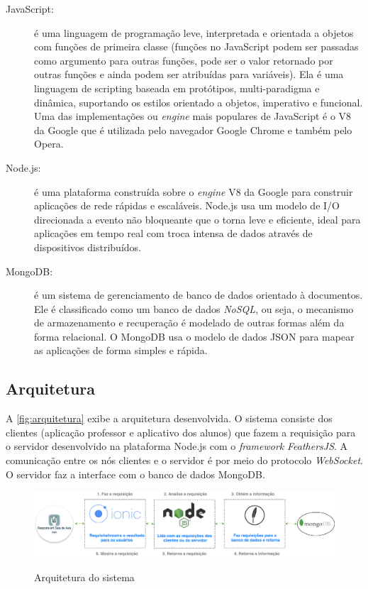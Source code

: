 \begin{description}
  \item[JavaScript:] é uma linguagem de programação leve, interpretada e orientada a objetos com funções de primeira classe
  (funções no JavaScript podem ser passadas como argumento para outras funções, pode ser o valor retornado por outras funções e ainda
  podem ser atribuídas para variáveis).
  Ela é uma linguagem de scripting baseada em protótipos, multi-paradigma e dinâmica, suportando os estilos orientado a objetos, imperativo e funcional.
  Uma das implementações ou \textit{engine} mais populares de JavaScript é o V8 da Google que
  é utilizada pelo navegador Google Chrome e também pelo Opera.
  \item[Node.js:] é uma plataforma construída sobre o \textit{engine} V8 da Google
  para construir aplicações de rede rápidas e escaláveis. Node.js usa um modelo de I/O direcionada a
  evento não bloqueante que o torna leve e eficiente, ideal para aplicações em
  tempo real com troca intensa de dados através de dispositivos distribuídos.
  \item[MongoDB:] é um sistema de gerenciamento de banco de dados orientado à documentos.
  Ele é classificado como um banco de dados \textit{NoSQL}, ou seja, o mecanismo de
  armazenamento e recuperação é modelado de outras formas além da forma relacional. O MongoDB  usa o modelo de
  dados JSON para mapear as aplicações de forma simples e rápida.
\end{description}

\subsection{Arquitetura}

A \autoref{fig:arquitetura} exibe a arquitetura desenvolvida. O sistema
consiste dos clientes (aplicação professor e aplicativo dos alunos) que
fazem a requisição para o servidor desenvolvido na plataforma Node.js com o \textit{framework}
\textit{FeathersJS}. A comunicação entre os nós clientes e o servidor é por
meio do protocolo \textit{WebSocket}. O servidor faz a interface com o banco de
dados MongoDB.

\begin{figure}[!ht]
  \centering

  \caption{Arquitetura do sistema}
  \includegraphics[scale=.45]{imagens/arquitetura.pdf}
  \label{fig:arquitetura}
  \doautor

\end{figure}

